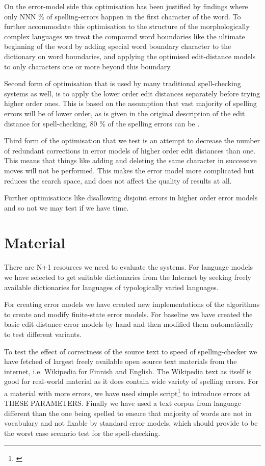 \documentclass[11pt]{article}
\begin{document}
On the error-model side this optimisation has been
justified by findings where only NNN \% of spelling-errors happen in the first
character of the word\cite{Yannakoudakis/1983}. To further accommodate this
optimisation to the structure of the morphologically complex languages we treat
the compound word boundaries like the ultimate beginning of the word by adding
special word boundary character to the dictionary on word boundaries, and
applying the optimised edit-distance models to only characters one or more
beyond this boundary.

Second form of optimisation that is used by many traditional spell-checking
systems as well, is to apply the lower order edit distances separately before
trying higher order ones. This is based on the assumption that vast majority
of spelling errors will be of lower order, as is given in the original
description of the edit distance for spell-checking, 80 \% of the spelling
errors can be \cite{Pollock/1984}.

Third form of the optimisation that we test is an attempt to decrease the
number of redundant corrections in error models of higher order edit distances
than one. This means that things like  adding and deleting the
same character in successive moves will not be performed. This makes the error
model more complicated but reduces the search space, and does not affect the
quality of results at all.

Further optimisations like disallowing disjoint errors in higher order error
models and so not we may test if we have time.

\section{Material}
\label{sec:materials}

There are N+1 resources we need to evaluate the systems. For language models
we have selected to get suitable dictionaries from the Internet by seeking
freely available dictionaries for languages of typologically varied
languages.

For creating error models we have created new implementations of the algorithms
to create and modify finite-state error models. For baseline we have created
the basic edit-distance error models by hand and then modified them
automatically to test different variants.

To test the effect of correctness of the source text to speed of
spelling-checker we have fetched of largest freely available open source text
materials from the internet, i.e. Wikipedia for Finnish and English. The
Wikipedia text as itself is good for real-world material as it does contain
wide variety of spelling errors. For a material with more errors, we have used
simple script\footnote{\url{}} to introduce errors at THESE PARAMETERS. Finally
we have used a text corpus from language different than the one being spelled
to ensure that majority of words are not in vocabulary and not fixable by
standard error models, which should provide to be the worst case scenario test
for the spell-checking.
\end{document}
